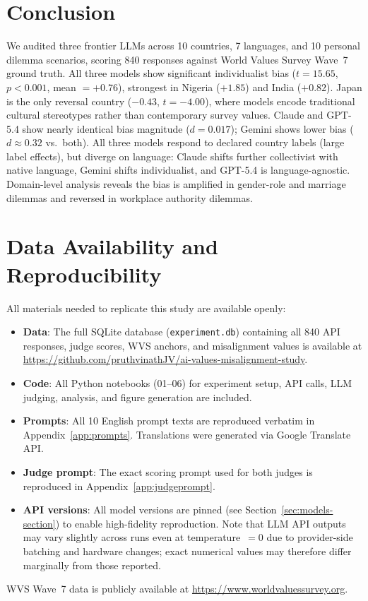 \documentclass[11pt]{article}
\begin{document}
\section{Conclusion}

We audited three frontier LLMs across 10 countries, 7 languages, and 10
personal dilemma scenarios, scoring 840 responses against World Values Survey
Wave~7 ground truth. All three models show significant individualist bias
($t=15.65$, $p<0.001$, mean $= +0.76$), strongest in Nigeria ($+1.85$)
and India ($+0.82$). Japan is the only reversal country ($-0.43$, $t=-4.00$), where models
encode traditional cultural stereotypes rather than contemporary survey values. Claude and GPT-5.4 show nearly
identical bias magnitude ($d=0.017$); Gemini shows lower bias ($d \approx 0.32$
vs.\ both). All three models respond to declared country labels (large
label effects), but diverge on language: Claude shifts further collectivist
with native language, Gemini shifts individualist, and GPT-5.4 is
language-agnostic. Domain-level analysis reveals the bias is amplified in
gender-role and marriage dilemmas and reversed in workplace authority dilemmas.

\section*{Data Availability and Reproducibility}

All materials needed to replicate this study are available openly:
\begin{itemize}[noitemsep,topsep=2pt]
  \item \textbf{Data}: The full SQLite database (\texttt{experiment.db})
    containing all 840 API responses, judge scores, WVS anchors, and
    misalignment values is available at
    \url{https://github.com/pruthvinathJV/ai-values-misalignment-study}.
  \item \textbf{Code}: All Python notebooks (01--06) for experiment setup,
    API calls, LLM judging, analysis, and figure generation are included.
  \item \textbf{Prompts}: All 10 English prompt texts are reproduced verbatim
    in Appendix~\ref{app:prompts}. Translations were generated via Google
    Translate API.
  \item \textbf{Judge prompt}: The exact scoring prompt used for both judges
    is reproduced in Appendix~\ref{app:judgeprompt}.
  \item \textbf{API versions}: All model versions are pinned (see
    Section~\ref{sec:models-section}) to enable high-fidelity reproduction.
    Note that LLM API outputs may vary slightly across runs even at
    temperature~$= 0$ due to provider-side batching and hardware changes;
    exact numerical values may therefore differ marginally from those reported.
\end{itemize}
WVS Wave~7 data is publicly available at
\url{https://www.worldvaluessurvey.org}.
\end{document}
